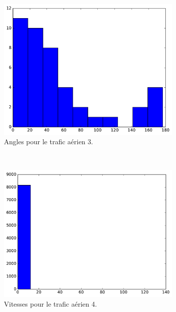 \begin{figure}
\begin{subfigure}[t]{\subImgWaStats}
			\centering
			\includegraphics[width=\textwidth]{figures/ch3/hkg_angle}
			\caption{Angles pour le trafic aérien 3.}
			\label{fig:hkg_angle}
		\end{subfigure}
		~
		\begin{subfigure}[t]{\subImgWaStats}
			\centering
			\includegraphics[width=\textwidth]{figures/ch3/flightradar2a_speed}
			\caption{Vitesses pour le trafic aérien 4.}
			\label{fig:flightradar2a_speed}
		\end{subfigure}
		~
		\begin{subfigure}[t]{\subImgWaStats}
			\centering

\end{subfigure}
\end{figure}
